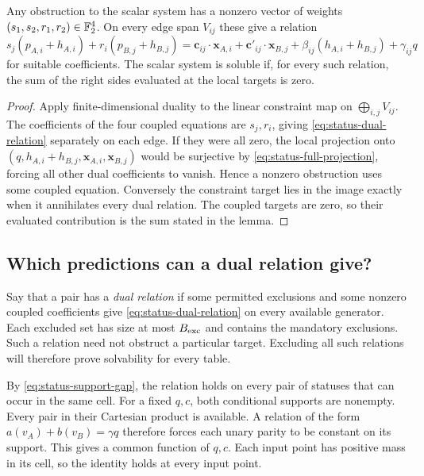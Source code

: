 \begin{lemma}
\label{lem:status-duality}
Any obstruction to the scalar system has a nonzero vector of weights
$(s_1,s_2,r_1,r_2)\in\mathbb F_2^4$. On every edge span $V_{ij}$ these give
a relation
\begin{equation}
\label{eq:status-dual-relation}
s_j(p_{A,i}+h_{A,i})+r_i(p_{B,j}+h_{B,j})
=\mathbf c_{ij}\cdot\mathbf x_{A,i}
 +\mathbf c'_{ij}\cdot\mathbf x_{B,j}
 +\beta_{ij}(h_{A,i}+h_{B,j})+\gamma_{ij}q
\end{equation}
for suitable coefficients. The scalar system is soluble if, for every
such relation, the sum of the right sides evaluated at the local targets
is zero.
\end{lemma}

\begin{proof}
Apply finite-dimensional duality to the linear constraint map on
$\bigoplus_{i,j}V_{ij}$. The coefficients of the four coupled equations
are $s_j,r_i$, giving \eqref{eq:status-dual-relation} separately on each
edge. If they were all zero, the local projection onto
$(q,h_{A,i}+h_{B,j},\mathbf x_{A,i},\mathbf x_{B,j})$ would be
surjective by \eqref{eq:status-full-projection}, forcing all other dual
coefficients to vanish. Hence a nonzero obstruction uses some coupled
equation. Conversely the constraint target lies in the image exactly
when it annihilates every dual relation. The coupled targets are zero,
so their evaluated contribution is the sum stated in the lemma.
\end{proof}

\subsection{Which predictions can a dual relation give?}

Say that a pair has a \emph{dual relation} if some permitted exclusions
and some nonzero coupled coefficients give \eqref{eq:status-dual-relation}
on every available generator. Each excluded set has size at most
$B_{\rm exc}$ and contains the mandatory exclusions. Such a relation
need not obstruct a particular target. Excluding all such relations will
therefore prove solvability for every table.

By \eqref{eq:status-support-gap}, the relation holds on every pair of
statuses that can occur in the same cell. For a fixed \(q,c\), both
conditional supports are nonempty. Every pair in their Cartesian product
is available. A relation of the form
\(a(v_A)+b(v_B)=\gamma q\) therefore forces each unary parity to be
constant on its support. This gives a common function of \(q,c\).
Each input point has positive mass in its cell, so the identity holds
at every input point.

